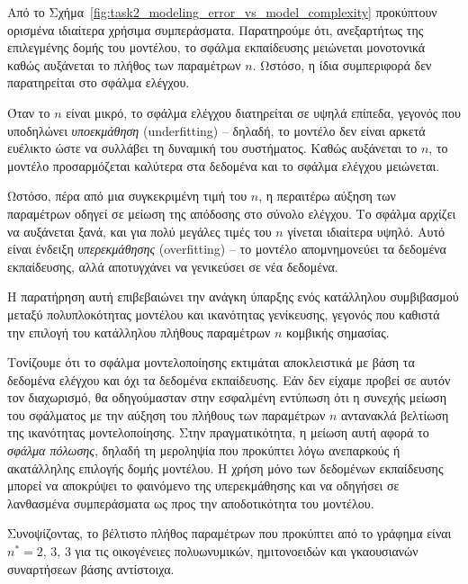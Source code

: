 \documentclass[a4paper,12pt]{article}
\begin{document}
Από το Σχήμα~\ref{fig:task2_modeling_error_vs_model_complexity} προκύπτουν ορισμένα ιδιαίτερα χρήσιμα
συμπεράσματα. Παρατηρούμε ότι, ανεξαρτήτως της επιλεγμένης δομής του μοντέλου, το σφάλμα εκπαίδευσης 
μειώνεται μονοτονικά καθώς αυξάνεται το πλήθος των παραμέτρων $n$. Ωστόσο, η ίδια συμπεριφορά δεν 
παρατηρείται στο σφάλμα ελέγχου.

Όταν το $n$ είναι μικρό, το σφάλμα ελέγχου διατηρείται σε υψηλά επίπεδα, γεγονός που υποδηλώνει 
\textit{υποεκμάθηση} (underfitting) -- δηλαδή, το μοντέλο 
δεν είναι αρκετά ευέλικτο ώστε να συλλάβει τη δυναμική του συστήματος. Καθώς αυξάνεται το $n$, το 
μοντέλο προσαρμόζεται καλύτερα στα δεδομένα και το σφάλμα ελέγχου μειώνεται.

Ωστόσο, πέρα από μια συγκεκριμένη τιμή του $n$, η περαιτέρω αύξηση των παραμέτρων οδηγεί σε μείωση της 
απόδοσης στο σύνολο ελέγχου. Το σφάλμα αρχίζει να αυξάνεται ξανά, και για πολύ μεγάλες τιμές του $n$ 
γίνεται ιδιαίτερα υψηλό. Αυτό είναι ένδειξη \textit{υπερεκμάθησης} 
(overfitting) -- το μοντέλο απομνημονεύει τα 
δεδομένα εκπαίδευσης, αλλά αποτυγχάνει να γενικεύσει σε νέα δεδομένα.

Η παρατήρηση αυτή επιβεβαιώνει την ανάγκη ύπαρξης ενός κατάλληλου συμβιβασμού μεταξύ πολυπλοκότητας 
μοντέλου και ικανότητας γενίκευσης, γεγονός που καθιστά την επιλογή του κατάλληλου πλήθους παραμέτρων 
$n$ κομβικής σημασίας.

Τονίζουμε ότι το σφάλμα μοντελοποίησης εκτιμάται αποκλειστικά με βάση τα δεδομένα ελέγχου και όχι τα 
δεδομένα εκπαίδευσης. Εάν δεν είχαμε προβεί σε αυτόν τον διαχωρισμό, θα οδηγούμασταν στην εσφαλμένη 
εντύπωση ότι η συνεχής μείωση του σφάλματος με την αύξηση του πλήθους των παραμέτρων $n$ αντανακλά 
βελτίωση της ικανότητας μοντελοποίησης. Στην πραγματικότητα, η μείωση αυτή αφορά το \textit{σφάλμα πόλωσης}, 
δηλαδή τη μεροληψία που προκύπτει λόγω ανεπαρκούς ή ακατάλληλης επιλογής δομής μοντέλου. Η χρήση μόνο των 
δεδομένων εκπαίδευσης μπορεί να αποκρύψει το φαινόμενο της υπερεκμάθησης και να οδηγήσει σε λανθασμένα 
συμπεράσματα ως προς την αποδοτικότητα του μοντέλου.

Συνοψίζοντας, το βέλτιστο πλήθος παραμέτρων που προκύπτει από το γράφημα είναι $n^* = 2, \, 3, \, 3$
για τις οικογένειες πολυωνυμικών, ημιτονοειδών και γκαουσιανών συναρτήσεων βάσης αντίστοιχα.
\end{document}
